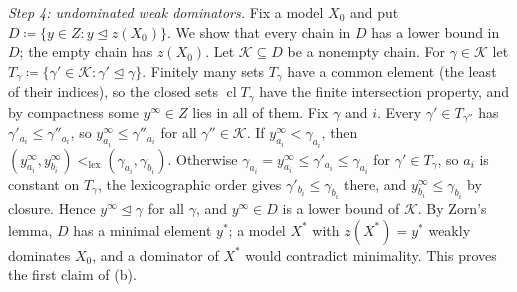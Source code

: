 \documentclass[11pt]{article}
\newcommand{\lexlt}{<_{\mathrm{lex}}}
\DeclareMathOperator{\cl}{cl}
\theoremstyle{plain}
\theoremstyle{definition}
\theoremstyle{remark}
\begin{document}
\emph{Step 4: undominated weak dominators.} Fix a model $X_0$ and put $D\coloneqq\{y\in Z:y
\trianglelefteq z(X_0)\}$. We show that every chain in $D$ has a lower bound in $D$; the empty
chain has $z(X_0)$. Let $\mathcal K\subseteq D$ be a nonempty chain. For $\gamma\in\mathcal
K$ let $T_\gamma\coloneqq\{\gamma'\in\mathcal K:\gamma'\trianglelefteq\gamma\}$. Finitely many
sets $T_\gamma$ have a common element (the least of their indices), so the closed sets $\cl
T_\gamma$ have the finite intersection property, and by compactness some $y^\infty\in Z$ lies in
all of them. Fix $\gamma$ and $i$. Every $\gamma'\in T_{\gamma''}$ has $\gamma'_{a_i}\le
\gamma''_{a_i}$, so $y^\infty_{a_i}\le\gamma''_{a_i}$ for all $\gamma''\in\mathcal K$. If
$y^\infty_{a_i}<\gamma_{a_i}$, then $(y^\infty_{a_i},y^\infty_{b_i})\lexlt(\gamma_{a_i},
\gamma_{b_i})$. Otherwise $\gamma_{a_i}=y^\infty_{a_i}\le\gamma'_{a_i}\le\gamma_{a_i}$ for
$\gamma'\in T_\gamma$, so $a_i$ is constant on $T_\gamma$, the lexicographic order gives
$\gamma'_{b_i}\le\gamma_{b_i}$ there, and $y^\infty_{b_i}\le\gamma_{b_i}$ by closure. Hence
$y^\infty\trianglelefteq\gamma$ for all $\gamma$, and $y^\infty\in D$ is a lower bound of
$\mathcal K$. By Zorn's lemma, $D$ has a minimal element $y^\ast$; a model $X^\ast$ with
$z(X^\ast)=y^\ast$ weakly dominates $X_0$, and a dominator of $X^\ast$ would contradict
minimality. This proves the first claim of (b).
\end{document}
